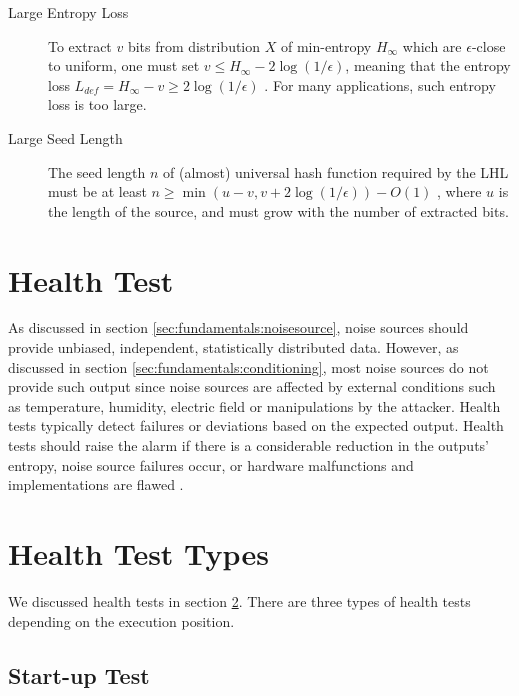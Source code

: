 \begin{description}
	\item[Large Entropy Loss] To extract $v$ bits from distribution $X$ of min-entropy $H_{\infty}$ which are $\epsilon$-close to uniform, one must set $v\le H_{\infty}{-}2\log(1/\epsilon)$, meaning that the entropy loss $L_{def}=H_{\infty}{-}v\ge2\log(1/\epsilon)$ \cite{LHL-2011}. For many applications, such entropy loss is too large. 
	
	\item[Large Seed Length] The seed length $n$ of (almost) universal hash function required by the LHL must be at least $n\ge \min(u{-}v,v+2\log(1/\epsilon)){-}O(1)$ \cite{LHL-2011}, where $u$ is the length of the source, and must grow with the number of extracted bits.
\end{description}

%
%
\section{Health Test}
\label{sec:fundamentals:HT}

As discussed in section \ref{sec:fundamentals:noisesource}, noise sources should provide unbiased, independent, statistically distributed data. However, as discussed in section \ref{sec:fundamentals:conditioning}, most noise sources do not provide such output since noise sources are affected by external conditions such as temperature, humidity, electric field or manipulations by the attacker. Health tests typically detect failures or deviations based on the expected output. Health tests should raise the alarm if there is a considerable reduction in the outputs’ entropy, noise source failures occur, or hardware malfunctions and implementations are flawed \cite{SP90B-2018}.

%
%
\section{Health Test Types}
\label{sec:fundamentals:HTT}
We discussed health tests in section \ref{sec:fundamentals:HTT}. There are three types of health tests depending on the execution position.

%
%
\subsection{Start-up Test}
\label{subsec:fundamentals:HTT:SUT}

